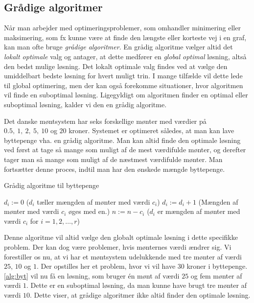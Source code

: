 \subsection{Grådige algoritmer}
Når man arbejder med optimeringsproblemer, som omhandler minimering eller maksimering, som fx kunne være at finde den længste eller korteste vej i en graf, kan man ofte bruge \emph{grådige algoritmer}.
En grådig algoritme vælger altid det \emph{lokalt optimale} valg og antager, at dette medfører en \emph{global optimal} løsning, altså den bedst mulige løsning. Det lokalt optimale valg findes ved at vælge den umiddelbart bedste løsning for hvert muligt trin.
I mange tilfælde vil dette lede til global optimering, men der kan også forekomme situationer, hvor algoritmen vil finde en suboptimal løsning. Ligegyldigt om algoritmen finder en optimal eller suboptimal løsning, kalder vi den en grådig algoritme. 
   
    

\begin{exmp}
Det danske møntsystem har seks forskellige mønter med værdier på $0.5,\ 1,\ 2,\ 5,\ 10$ og $20$ kroner. Systemet er optimeret således, at man kan lave byttepenge vha. en grådig algoritme. Man kan altid finde den optimale løsning ved først at tage så mange som muligt af de mest værdifulde mønter, og derefter tager man så mange som muligt af de næstmest værdifulde mønter. Man fortsætter denne proces, indtil man har den ønskede mængde byttepenge.
\begin{algorithm} [H] 
\caption{Grådig algoritme til byttepenge}
\label{alg:byt}
\begin{algorithmic}[1]

\EndProcedure
{}
    \State $d_i:=0$ ($d_i$ tæller mængden af mønter med værdi $c_i$)
    	\State $d_i := d_i+1$ (Mængden af mønter med værdi $c_i$ øges med en.)
    	\State $n := n-c_i$
\EndWhile
\EndFor
\State ($d_i$ er mængden af mønter med værdi $c_i$ for $i=1,2,\dotsc,r$)
\end{algorithmic}
\end{algorithm}
Denne algoritme vil altid vælge den globalt optimale løsning i dette specifikke problem. Der kan dog være problemer, hvis mønternes værdi ændrer sig. 
Vi forestiller os nu, at vi har et møntsystem udelukkende med tre mønter af værdi $25$, $10$ og $1$. Der opstilles her et problem, hvor vi vil have $30$ kroner i byttepenge. \autoref{alg:byt} vil nu få en løsning, som bruger én mønt af værdi $25$ og fem mønter af værdi $1$. Dette er en suboptimal løsning, da man kunne have brugt tre mønter af værdi $10$.
Dette viser, at grådige algoritmer ikke altid finder den optimale løsning.
\end{exmp}

